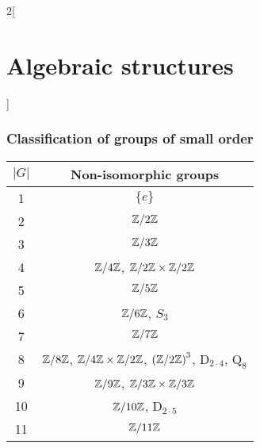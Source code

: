 \documentclass[../../../main.tex]{subfiles}
\begin{document}
\begin{multicols}{2}[\section{Algebraic structures}]
  \subsubsection*{Classification of groups of small order}
  \begin{center}
    \begin{tabular}{|c|c|}
      \hline
      $|G|$ & Non-isomorphic groups                                                                                                                \\
      \hline
      1     & $\{e\}$                                                                                                                              \\
      \hline
      2     & $\quot{\ZZ}{2\ZZ}$                                                                                                                   \\
      \hline
      3     & $\quot{\ZZ}{3\ZZ}$                                                                                                                   \\
      \hline
      4     & $\quot{\ZZ}{4\ZZ}$, $\quot{\ZZ}{2\ZZ}\times\quot{\ZZ}{2\ZZ}$                                                                         \\
      \hline
      5     & $\quot{\ZZ}{5\ZZ}$                                                                                                                   \\
      \hline
      6     & $\quot{\ZZ}{6\ZZ}$, $S_3$                                                                                                            \\
      \hline
      7     & $\quot{\ZZ}{7\ZZ}$                                                                                                                   \\
      \hline
      8     & $\quot{\ZZ}{8\ZZ}$, $\quot{\ZZ}{4\ZZ}\times\quot{\ZZ}{2\ZZ}$, $\left(\quot{\ZZ}{2\ZZ}\right)^3$, $\text{D}_{2\cdot 4}$, $\text{Q}_8$ \\
      \hline
      9     & $\quot{\ZZ}{9\ZZ}$, $\quot{\ZZ}{3\ZZ}\times\quot{\ZZ}{3\ZZ}$                                                                         \\
      \hline
      10    & $\quot{\ZZ}{10\ZZ}$, $\text{D}_{2\cdot 5}$                                                                                           \\
      \hline
      11    & $\quot{\ZZ}{11\ZZ}$                                                                                                                  \\

\end{tabular}
\end{center}
\end{multicols}
\end{document}
